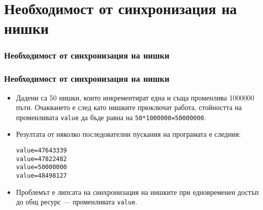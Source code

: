 \documentclass[ignorenonframetext, hyperref=unicode,compress]{beamer}
\begin{document}
\begin{frame}[containsverbatim,shrink=5]

\end{frame}

\begin{frame}[containsverbatim,shrink=5]

\end{frame}

\section{Необходимост от синхронизация на нишки}
\begin{frame}[containsverbatim,shrink=5]
\frametitle{Необходимост от синхронизация на нишки}

\end{frame}

\begin{frame}[containsverbatim,shrink=5]

\end{frame}

\begin{frame}[containsverbatim,shrink=5]
\frametitle{Необходимост от синхронизация на нишки}
\begin{itemize}
\item Дадени са 50 нишки, които инкрементират една и съща променлива 1000000
пъти. Очакването е след като нишките прюключат работа, стойността на
променливата \lstinline{value} да бъде равна на \lstinline{50*1000000=50000000}.
\item Резултата от няколко последователни пускания на програмата е следния:
\begin{verbatim}
value=47643339
value=47822482
value=50000000
value=48498127
\end{verbatim}
\item Проблемът е липсата на синхронизация на нишките при едновременен достъп
до общ ресурс --- променливата \lstinline{value}.
\end{itemize}
\end{frame}
\end{document}
